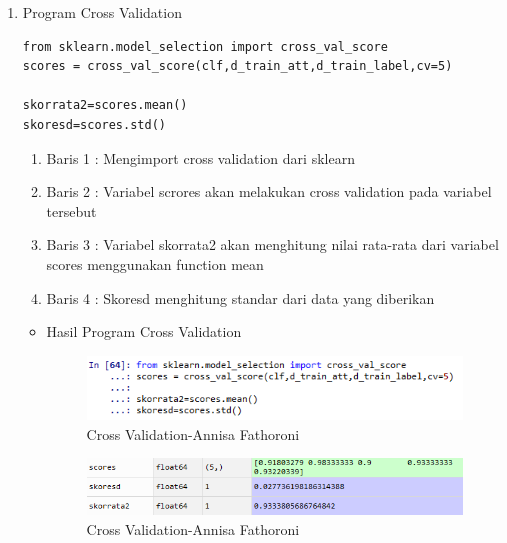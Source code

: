 \begin{enumerate}
\begin{itemize}
\end{itemize}

\item Program Cross Validation
\begin{verbatim}
from sklearn.model_selection import cross_val_score
scores = cross_val_score(clf,d_train_att,d_train_label,cv=5)

skorrata2=scores.mean()
skoresd=scores.std()
\end{verbatim}

\begin{enumerate}
\item Baris 1 : Mengimport cross validation dari sklearn
\item Baris 2 : Variabel scrores akan melakukan cross validation pada variabel tersebut
\item Baris 3 : Variabel skorrata2 akan menghitung nilai rata-rata dari variabel scores menggunakan function mean
\item Baris 4 : Skoresd menghitung standar dari data yang diberikan
\end{enumerate}

\begin{itemize}
\item Hasil Program Cross Validation

\begin{figure}[!hbtp]
\centering
\includegraphics[scale=0.6]{figures/Chapter4AnnisaFathoroni25.png}
\caption{Cross Validation-Annisa Fathoroni}
\label{Cross Validation-Annisa Fathoroni}
\end{figure}

\begin{figure}[!hbtp]
\centering
\includegraphics[scale=0.6]{figures/Chapter4AnnisaFathoroni26.png}
\caption{Cross Validation-Annisa Fathoroni}
\label{Cross Validation-Annisa Fathoroni}
\end{figure}


\end{itemize}
\end{enumerate}
